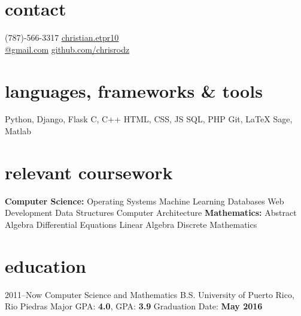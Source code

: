 \documentclass[]{friggeri-cv}
\begin{document}


\begin{aside} %
\section{contact}
(787)-566-3317
\href{mailto:christian.etpr10@gmail.com}{christian.etpr10 \\ @gmail.com}
\href{http://github.com/chrisrodz}{github.com/chrisrodz}
\section{languages, frameworks \& tools}
Python, Django, Flask
C, C++
HTML, CSS, JS
SQL, PHP
Git, LaTeX
Sage, Matlab
\section{relevant coursework}
\vspace{1em} \textbf{Computer Science:}
Operating Systems
Machine Learning
Databases
Web Development
Data Structures 
Computer Architecture\vspace{1em}
\textbf{Mathematics:}
Abstract Algebra
Differential Equations
Linear Algebra
Discrete Mathematics
\end{aside}


\section{education}

\begin{entrylist}
\entry
{2011--Now}
{Computer Science and Mathematics B.S.}
{University of Puerto Rico, Rio Piedras}
{Major GPA: \textbf{4.0}, GPA: \textbf{3.9} Graduation Date: \textbf{May 2016}}
\end{entrylist}
\end{document}
